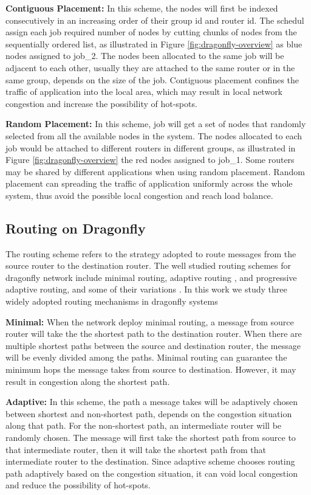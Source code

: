 \documentclass[conference,compsoc]{IEEEtran}
\begin{document}
\textbf{Contiguous Placement:} In this scheme, the nodes will first be indexed consecutively in an increasing order of their group id and router id. The schedul assign each job required number of nodes by cutting chunks of nodes from the sequentially ordered list, as illustrated in Figure \ref{fig:dragonfly-overview} as blue nodes assigned to job\_2. The nodes been allocated to the same job will be adjacent to each other, usually they are attached to the same router or in the same group, depends on the size of the job. Contiguous placement confines the traffic of application into the local area, which may result in local network congestion and increase the possibility of hot-spots. 

\textbf{Random Placement:} In this scheme, job will get a set of nodes that randomly selected from all the available nodes in the system. The nodes allocated to each job would be attached to different routers in different groups, as illustrated in Figure \ref{fig:dragonfly-overview} the red nodes assigned to job\_1. Some routers may be shared by different applications when using random placement. Random placement can spreading the traffic of application uniformly across the whole system, thus avoid the possible local congestion and reach load balance.


\subsection{Routing on Dragonfly}
\label{sec:routing-schemes}
The routing scheme refers to the strategy adopted to route messages from the source router to the destination router. The well studied routing schemes for dragonfly network include minimal routing, adaptive routing \cite{dally-dragonfly}, and progressive adaptive routing\cite{jiang}, and some of their variations \cite{won-prog-adaptive}. In this work we study three widely adopted routing mechanisms in dragonfly systems

\textbf{Minimal:} When the network deploy minimal routing, a message from source router will take the the shortest path to the destination router. When there are multiple shortest paths between the source and destination router, the message will be evenly divided among the paths. Minimal routing can guarantee the minimum hops the message takes from source to destination. However, it may result in congestion along the shortest path. 


\textbf{Adaptive:} In this scheme, the path a message takes will be adaptively chosen between shortest and non-shortest path, depends on the congestion situation along that path. For the non-shortest path, an intermediate router will be randomly chosen. The message will first take the shortest path from source to that intermediate router, then it will take the shortest path from that intermediate router to the destination. Since adaptive scheme chooses routing path adaptively based on the congestion situation, it can void local congestion and reduce the possibility of hot-spots. 
\end{document}

